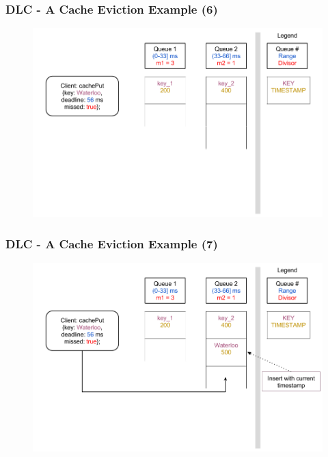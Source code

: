 \documentclass{beamer}
\begin{document}
\begin{frame}
  \frametitle{DLC - A Cache Eviction Example (6)}
  \begin{figure}
    \begin{center}
      \centerline{\includegraphics[scale=0.37]{img/DLC_V8_06.png}}
    \end{center}
  \end{figure}
\end{frame}

\begin{frame}
  \frametitle{DLC - A Cache Eviction Example (7)}
  \begin{figure}
    \begin{center}
      \centerline{\includegraphics[scale=0.37]{img/DLC_V8_07.png}}
    \end{center}
  \end{figure}
\end{frame}
\end{document}
